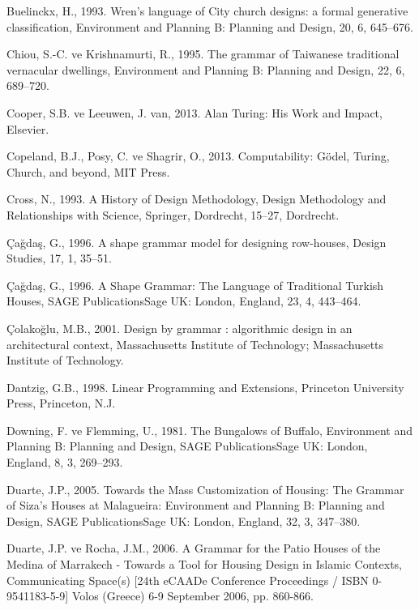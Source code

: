 \documentclass[12pt,turkish,a4paperpaper,]{report}
\begin{document}
\leavevmode\hypertarget{ref-Buelinckx:1993io}{}%
Buelinckx, H., 1993. Wren's language of City church designs: a formal
generative classification, Environment and Planning B: Planning and
Design, 20, 6, 645--676.

\leavevmode\hypertarget{ref-Chiou:1995gj}{}%
Chiou, S.-C. ve Krishnamurti, R., 1995. The grammar of Taiwanese
traditional vernacular dwellings, Environment and Planning B: Planning
and Design, 22, 6, 689--720.

\leavevmode\hypertarget{ref-Cooper:2013iu}{}%
Cooper, S.B. ve Leeuwen, J. van, 2013. Alan Turing: His Work and Impact,
Elsevier.

\leavevmode\hypertarget{ref-Copeland:2013vk}{}%
Copeland, B.J., Posy, C. ve Shagrir, O., 2013. Computability: Gödel,
Turing, Church, and beyond, MIT Press.

\leavevmode\hypertarget{ref-Cross:1993jv}{}%
Cross, N., 1993. A History of Design Methodology, Design Methodology and
Relationships with Science, Springer, Dordrecht, 15--27, Dordrecht.

\leavevmode\hypertarget{ref-Cagdas:1996fe}{}%
Çağdaş, G., 1996. A shape grammar model for designing row-houses, Design
Studies, 17, 1, 35--51.

\leavevmode\hypertarget{ref-Cagdas:1996ft}{}%
Çağdaş, G., 1996. A Shape Grammar: The Language of Traditional Turkish
Houses, SAGE PublicationsSage UK: London, England, 23, 4, 443--464.

\leavevmode\hypertarget{ref-Colakoglu:2001wi}{}%
Çolakoğlu, M.B., 2001. Design by grammar : algorithmic design in an
architectural context, Massachusetts Institute of Technology;
Massachusetts Institute of Technology.

\leavevmode\hypertarget{ref-Dantzig:1998tv}{}%
Dantzig, G.B., 1998. Linear Programming and Extensions, Princeton
University Press, Princeton, N.J.

\leavevmode\hypertarget{ref-Downing:1981dx}{}%
Downing, F. ve Flemming, U., 1981. The Bungalows of Buffalo, Environment
and Planning B: Planning and Design, SAGE PublicationsSage UK: London,
England, 8, 3, 269--293.

\leavevmode\hypertarget{ref-Duarte:2005gd}{}%
Duarte, J.P., 2005. Towards the Mass Customization of Housing: The
Grammar of Siza's Houses at Malagueira: Environment and Planning B:
Planning and Design, SAGE PublicationsSage UK: London, England, 32, 3,
347--380.

\leavevmode\hypertarget{ref-Duarte:2006wg}{}%
Duarte, J.P. ve Rocha, J.M., 2006. A Grammar for the Patio Houses of the
Medina of Marrakech - Towards a Tool for Housing Design in Islamic
Contexts, Communicating Space(s) {[}24th eCAADe Conference Proceedings /
ISBN 0-9541183-5-9{]} Volos (Greece) 6-9 September 2006, pp. 860-866.
\end{document}
